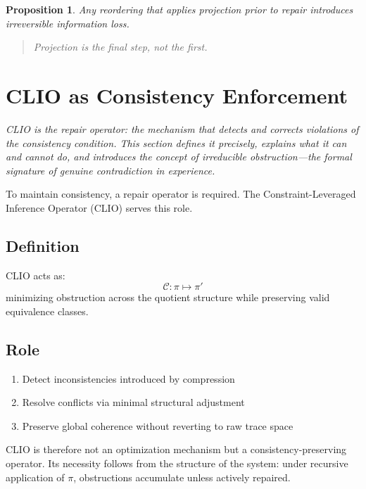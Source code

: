 \documentclass[12pt,a4paper]{article}
\newtheorem{proposition}[theorem]{Proposition}
\begin{document}
\begin{proposition}
Any reordering that applies projection prior to repair introduces irreversible information loss.
\end{proposition}

\begin{quote}
\emph{Projection is the final step, not the first.}
\end{quote}

\section{CLIO as Consistency Enforcement}
\label{sec:clio}

\textit{CLIO is the repair operator: the mechanism that detects and corrects violations of the consistency condition. This section defines it precisely, explains what it can and cannot do, and introduces the concept of irreducible obstruction---the formal signature of genuine contradiction in experience.}

To maintain consistency, a repair operator is required. The Constraint-Leveraged Inference Operator (CLIO) serves this role.

\subsection{Definition}

CLIO acts as:
\[
\mathcal{C} : \pi \mapsto \pi'
\]
minimizing obstruction across the quotient structure while preserving valid equivalence classes.

\subsection{Role}

\begin{enumerate}[noitemsep]
\item Detect inconsistencies introduced by compression
\item Resolve conflicts via minimal structural adjustment
\item Preserve global coherence without reverting to raw trace space
\end{enumerate}

CLIO is therefore not an optimization mechanism but a consistency-preserving operator. Its necessity follows from the structure of the system: under recursive application of $\pi$, obstructions accumulate unless actively repaired.
\end{document}
